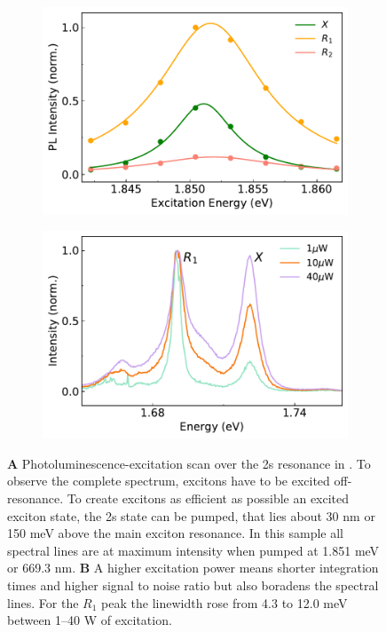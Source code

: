 \begin{figure}[t]
	\begin{subfigure}{0.49\textwidth}
		\caption{}
		\includegraphics[width=\textwidth]{ple_2s}
	\end{subfigure}
	\begin{subfigure}{0.49\textwidth}
		\caption{}
		\includegraphics[width=\textwidth]{power}
	\end{subfigure}
	\caption{\textbf{A} Photoluminescence-excitation scan over the 2s resonance in \wse\!. To observe the complete spectrum, excitons have to be excited off-resonance. To create excitons as efficient as possible an excited exciton state, the 2s state can be pumped, that lies about 30 nm or 150 meV above the main exciton resonance. In this sample all spectral lines are at maximum intensity when pumped at 1.851 meV or 669.3 nm. \textbf{B} A higher excitation power means shorter integration times and higher signal to noise ratio but also boradens the spectral lines. For the $R_1$ peak the linewidth rose from 4.3 to 12.0 meV between 1--40 \mu W of excitation.} 
	\label{optimum}
\end{figure}

